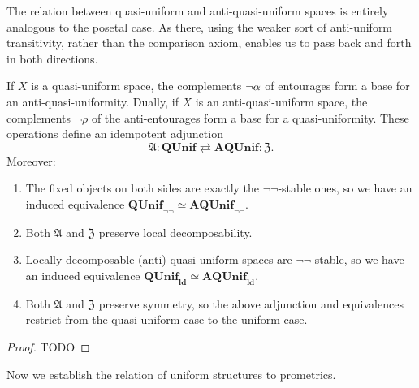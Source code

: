 \documentclass{article}
\let\implies\Rightarrow
\def\anti{\mathfrak{A}}
\def\neigh{\mathfrak{Z}}
\def\nn{\ensuremath{\neg\neg}}
\def\QUnif{\mathbf{QUnif}}
\def\QUnifnn{\mathbf{QUnif}_{\nn}}
\def\ldQUnif{\mathbf{QUnif}_{\mathbf{ld}}}
\def\AQUnifnn{\mathbf{AQUnif}_{\nn}}
\def\AQUnif{\mathbf{AQUnif}}
\def\ldAQUnif{\mathbf{AQUnif}_{\mathbf{ld}}}
\begin{document}
The relation between quasi-uniform and anti-quasi-uniform spaces is entirely analogous to the posetal case.
As there, using the weaker sort of anti-uniform transitivity, rather than the comparison axiom, enables us to pass back and forth in both directions.

\begin{thm}\label{thm:qunif-aqunif}
  If $X$ is a quasi-uniform space, the complements $\neg\alpha$ of entourages form a base for an anti-quasi-uniformity.
  Dually, if $X$ is an anti-quasi-uniform space, the complements $\neg\rho$ of the anti-entourages form a base for a quasi-uniformity.
  These operations define an idempotent adjunction
  \[ \anti : \QUnif \rightleftarrows \AQUnif : \neigh. \]
  Moreover:
  \begin{enumerate}
  \item The fixed objects on both sides are exactly the \nn-stable ones, so we have an induced equivalence $\QUnifnn \simeq \AQUnifnn$.
  \item Both $\anti$ and $\neigh$ preserve local decomposability.
  \item Locally decomposable (anti)-quasi-uniform spaces are \nn-stable, so we have an induced equivalence $\ldQUnif \simeq \ldAQUnif$.
  \item Both $\anti$ and $\neigh$ preserve symmetry, so the above adjunction and equivalences restrict from the quasi-uniform case to the uniform case.
  \end{enumerate}
\end{thm}
\begin{proof}
  TODO
\end{proof}

Now we establish the relation of uniform structures to prometrics.
\end{document}
